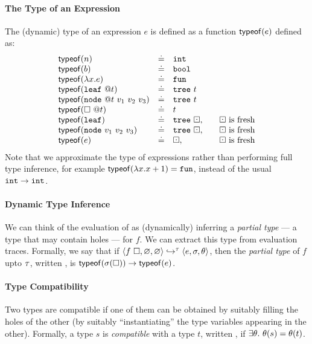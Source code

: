 \paragraph{The Type of an Expression} The (dynamic) type of an
expression $e$ is defined as a function $\mathsf{typeof}(e)$ defined as:
  \[
  \begin{array}{lcll}
    \typeof{n}   & \defeq & \tint & \\
    \typeof{b}   & \defeq & \tbool & \\
    \typeof{\efun{x}{e}} & \defeq & \tfun \\
    \typeof{\vleaf{t}} & \defeq & \ttree{t} \\
    \typeof{\vnode{t}{v_1}{v_2}{v_3}} & \defeq & \ttree{t} \\
    \typeof{\vhole{t}} & \defeq & t \\
    \typeof{\eleaf} & \defeq & \ttree{\thole}, & \quad \text{\thole is fresh} \\
    \typeof{\enode{v_1}{v_2}{v_3}} & \defeq & \ttree{\thole}, & \quad \text{\thole is fresh} \\
    \typeof{e} & \defeq & \thole, & \quad \text{\thole is fresh} \\
  \end{array}
  \]
%
Note that we approximate the type of expressions rather than
performing full type inference, for example
$\mathsf{typeof}(\lambda x. x + 1) = \mathtt{fun}$,
instead of the usual $\mathtt{int} \rightarrow \mathtt{int}$.

\paragraph{Dynamic Type Inference}
We can think of the evaluation of  as (dynamically)
inferring a \emph{partial type} --- a type that may contain holes ---
for $f$.
%
We can extract this type from evaluation traces.
%
Formally, we say that if
$\langle f\ \square{}, \varnothing, \varnothing \rangle \hookrightarrow^{\tau} \langle e, \sigma, \theta \rangle$,
then the \emph{partial type} of $f$ upto $\tau$, written ,
is $\mathsf{typeof}(\sigma(\square{})) \rightarrow \mathsf{typeof}(e)$.
%

\paragraph{Type Compatibility}
Two types are compatible if one of them can be obtained by
suitably filling the holes of the other (\ie by suitably ``instantiating''
the type variables appearing in the other). Formally, a type $s$ is
\emph{compatible} with a type $t$, written , if
$\exists \theta.\ \theta(s) = \theta(t)$.

